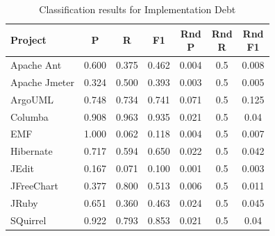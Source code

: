 \begin{table}[!hbt]
    \begin{center}
        \caption{Classification results for Implementation Debt}
        \label{tbl:classifier_results_implementation}
        \begin{tabular}{l| c c c c c c}
        \toprule
        \textbf{Project} & \textbf{P} & \textbf{R} & \textbf{F1} & \thead{Rnd\\P} & \thead{Rnd\\R} & \thead{Rnd\\F1} \\
        \midrule
        Apache Ant     &               0.600 &            0.375 &        0.462 &                     0.004 &                    0.5 &              0.008 \\
        Apache Jmeter  &               0.324 &            0.500 &        0.393 &                     0.003 &                    0.5 &              0.005 \\
        ArgoUML        &               0.748 &            0.734 &        0.741 &                     0.071 &                    0.5 &              0.125 \\
        Columba        &               0.908 &            0.963 &        0.935 &                     0.021 &                    0.5 &               0.04 \\
        EMF            &               1.000 &            0.062 &        0.118 &                     0.004 &                    0.5 &              0.007 \\
        Hibernate      &               0.717 &            0.594 &        0.650 &                     0.022 &                    0.5 &              0.042 \\
        JEdit          &               0.167 &            0.071 &        0.100 &                     0.001 &                    0.5 &              0.003 \\
        JFreeChart     &               0.377 &            0.800 &        0.513 &                     0.006 &                    0.5 &              0.011 \\
        JRuby          &               0.651 &            0.360 &        0.463 &                     0.024 &                    0.5 &              0.045 \\
        SQuirrel       &               0.922 &            0.793 &        0.853 &                     0.021 &                    0.5 &               0.04 \\
        \bottomrule
        \end{tabular}
    \end{center}    
\end{table}

